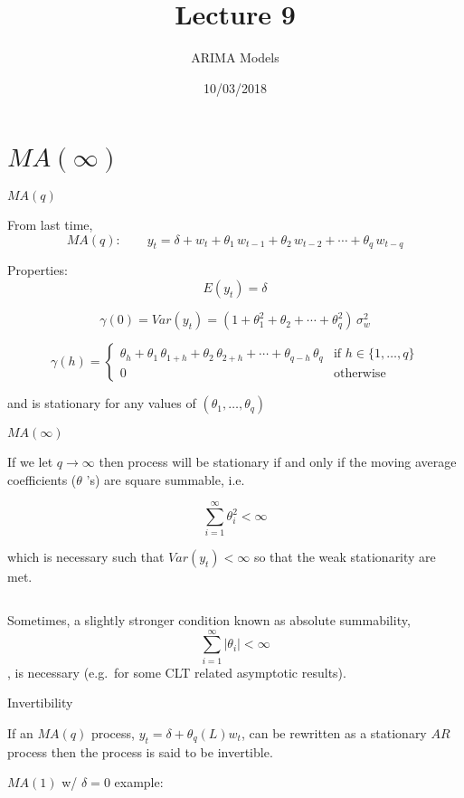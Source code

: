\documentclass[11pt,ignorenonframetext,]{beamer}
\title{Lecture 9}
\subtitle{ARIMA Models}
\date{10/03/2018}
\begin{document}
\frame{\titlepage}

\hypertarget{mainfty}{%
\section{\texorpdfstring{\(MA(\infty)\)}{MA(\textbackslash{}infty)}}\label{mainfty}}

\begin{frame}[t]{\(MA(q)\)}
\protect\hypertarget{maq}{}

From last time,
\[ MA(q): \qquad y_t = \delta + w_t + \theta_1 \, w_{t-1} + \theta_2 \, w_{t-2} + \cdots + \theta_q \, w_{t-q} \]

Properties: \[E(y_t) = \delta\]

\[
\gamma(0) = Var(y_t) = (1 + \theta_1^2 + \theta_2 + \cdots + \theta_q^2) \, \sigma_w^2
\]

\[
\gamma(h) = 
\begin{cases}
\theta_h + \theta_1 \, \theta_{1+h} + \theta_2 \, \theta_{2+h} + \cdots + \theta_{q-h}\, \theta_{q} & \text{if } h\in\{1,\ldots,q\} \\
0 & \text{otherwise}
\end{cases}
\]

and is stationary for any values of \((\theta_1, \ldots,\theta_q)\)

\end{frame}

\begin{frame}[t]{\(MA(\infty)\)}
\protect\hypertarget{mainfty-1}{}

If we let \(q \to \infty\) then process will be stationary if and only
if the moving average coefficients (\(\theta\) 's) are square summable,
i.e.

\[ \sum_{i=1}^\infty \theta_i^2 < \infty \]

which is necessary such that \(Var(y_t) < \infty\) so that the weak
stationarity are met.

\(~\)

Sometimes, a slightly stronger condition known as absolute summability,
\[\sum_{i=1}^\infty |\theta_i| < \infty\], is necessary (e.g.~for some
CLT related asymptotic results).

\end{frame}

\begin{frame}[t]{Invertibility}
\protect\hypertarget{invertibility}{}

If an \(MA(q)\) process, \(y_t = \delta + \theta_q(L) w_t\), can be
rewritten as a stationary \(AR\) process then the process is said to be
invertible.

\(MA(1)\) w/ \(\delta=0\) example:

\end{frame}
\end{document}
